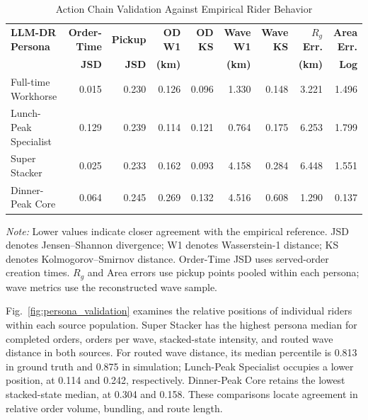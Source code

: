\documentclass[letterpaper,journal]{IEEEtran}
\begin{document}
\begin{table}[!t]
\caption{Action Chain Validation Against Empirical Rider Behavior}
\label{tab:validation_results}
\centering
\scriptsize
\setlength{\tabcolsep}{2pt}
\begin{tabular*}{0.70\textwidth}{@{\extracolsep{\fill}}lrrrrrrrr@{}}
\toprule
\textbf{LLM-DR Persona} & \textbf{Order-Time} & \textbf{Pickup} & \textbf{OD W1} & \textbf{OD KS} & \textbf{Wave W1} & \textbf{Wave KS} & \textbf{$R_g$ Err.} & \textbf{Area Err.} \\
 & \textbf{JSD} & \textbf{JSD} & \textbf{(km)} &  & \textbf{(km)} &  & \textbf{(km)} & \textbf{Log} \\
\midrule
Full-time Workhorse & 0.015 & 0.230 & 0.126 & 0.096 & 1.330 & 0.148 & 3.221 & 1.496 \\
Lunch-Peak Specialist & 0.129 & 0.239 & 0.114 & 0.121 & 0.764 & 0.175 & 6.253 & 1.799 \\
Super Stacker & 0.025 & 0.233 & 0.162 & 0.093 & 4.158 & 0.284 & 6.448 & 1.551 \\
Dinner-Peak Core & 0.064 & 0.245 & 0.269 & 0.132 & 4.516 & 0.608 & 1.290 & 0.137 \\
\bottomrule
\end{tabular*}
\par\vspace{1.5mm}
\begin{minipage}{0.70\textwidth}
\scriptsize
\raggedright
\emph{Note:} Lower values indicate closer agreement with the empirical reference. JSD denotes Jensen--Shannon divergence; W1 denotes Wasserstein-1 distance; KS denotes Kolmogorov--Smirnov distance. Order-Time JSD uses served-order creation times. $R_g$ and Area errors use pickup points pooled within each persona; wave metrics use the reconstructed wave sample.
\end{minipage}
\end{table}

Fig.~\ref{fig:persona_validation} examines the relative positions of individual riders within each source population. Super Stacker has the highest persona median for completed orders, orders per wave, stacked-state intensity, and routed wave distance in both sources. For routed wave distance, its median percentile is 0.813 in ground truth and 0.875 in simulation; Lunch-Peak Specialist occupies a lower position, at 0.114 and 0.242, respectively. Dinner-Peak Core retains the lowest stacked-state median, at 0.304 and 0.158. These comparisons locate agreement in relative order volume, bundling, and route length.
\end{document}
